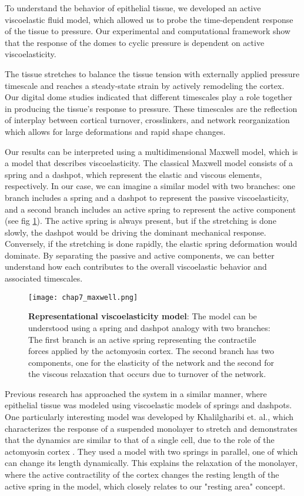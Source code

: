 To understand the behavior of epithelial tissue, we developed an active viscoelastic fluid model, which allowed us to probe the time-dependent response of the tissue to pressure. Our experimental and computational framework show that the response of the domes to cyclic pressure is dependent on active viscoelasticity.

The tissue stretches to balance the tissue tension with externally applied pressure timescale and reaches a steady-state strain by actively remodeling the cortex. Our digital dome studies indicated that different timescales play a role together in producing the tissue's response to pressure. These timescales are the reflection of  interplay between cortical turnover, crosslinkers, and network reorganization which allows for large deformations and rapid shape changes.

Our results can be interpreted using a multidimensional Maxwell model, which is a model that describes viscoelasticity. The classical Maxwell model consists of a spring and a dashpot, which represent the elastic and viscous elements, respectively. In our case, we can imagine a similar model with two branches: one branch includes a spring and a dashpot to represent the passive viscoelasticity, and a second branch includes an active spring to represent the active component (see fig \ref{fig_7_9}). The active spring is always present, but if the stretching is done slowly, the dashpot would be driving the dominant mechanical response. Conversely, if the stretching is done rapidly, the elastic spring deformation would dominate. By separating the passive and active components, we can better understand how each contributes to the overall viscoelastic behavior and associated timescales.

\begin{figure}
	\centering
	\texttt{[image: chap7\_maxwell.png]}
	\caption{\label{fig_7_9} \textbf{Representational viscoelasticity model}: The model can be understood using a spring and dashpot analogy with two branches: The first branch is an active spring representing the contractile forces applied by the actomyosin cortex. The second branch has two components, one for the elasticity of the network and the second for the viscous relaxation that occurs due to turnover of the network.
	}
\end{figure}

Previous research has approached the system in a similar manner, where epithelial tissue was modeled using viscoelastic models of springs and dashpots. One particularly interesting model was developed by Khalilgharibi et. al., which characterizes the response of a suspended monolayer to stretch and demonstrates that the dynamics are similar to that of a single cell, due to the role of the actomyosin cortex \cite{khalilgharibi2019}. They used a model with two springs in parallel, one of which can change its length dynamically. This explains the relaxation of the monolayer, where the active contractility of the cortex changes the resting length of the active spring in the model, which closely relates to our "resting area" concept.

